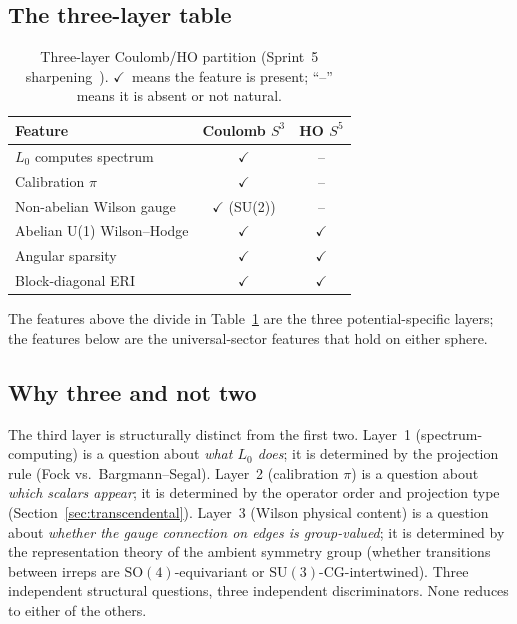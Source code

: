 \documentclass[twocolumn,pra,amsmath,amssymb,superscriptaddress]{revtex4-2}
\begin{document}
\subsection{The three-layer table}

\begin{table}[h]
\caption{Three-layer Coulomb/HO partition (Sprint~5
sharpening~\cite{paper25}).  $\checkmark$~means the feature is
present; ``--'' means it is absent or not natural.}
\label{tab:three_layers}
\begin{ruledtabular}
\begin{tabular}{lcc}
Feature & Coulomb $S^3$ & HO $S^5$ \\
\hline
$L_0$ computes spectrum & $\checkmark$ & -- \\
Calibration $\pi$ & $\checkmark$ & -- \\
Non-abelian Wilson gauge & $\checkmark$ (SU(2)) & -- \\
\hline
Abelian U(1) Wilson--Hodge & $\checkmark$ & $\checkmark$ \\
Angular sparsity & $\checkmark$ & $\checkmark$ \\
Block-diagonal ERI & $\checkmark$ & $\checkmark$ \\
\end{tabular}
\end{ruledtabular}
\end{table}

The features above the divide in Table~\ref{tab:three_layers} are
the three potential-specific layers; the features below are the
universal-sector features that hold on either sphere.

\subsection{Why three and not two}

The third layer is structurally distinct from the first two.  Layer~1
(spectrum-computing) is a question about \emph{what $L_0$ does}; it
is determined by the projection rule (Fock vs.\ Bargmann--Segal).
Layer~2 (calibration $\pi$) is a question about \emph{which scalars
appear}; it is determined by the operator order and projection type
(Section~\ref{sec:transcendental}).  Layer~3 (Wilson physical content)
is a question about \emph{whether the gauge connection on edges is
group-valued}; it is determined by the representation theory of the
ambient symmetry group (whether transitions between irreps are
$\mathrm{SO}(4)$-equivariant or $\mathrm{SU}(3)$-CG-intertwined).
Three independent structural questions, three independent
discriminators.  None reduces to either of the others.
\end{document}
